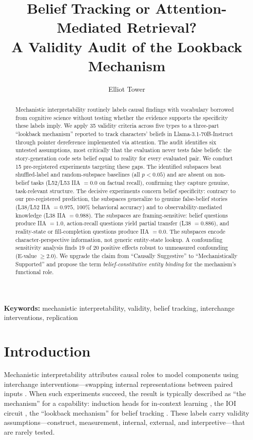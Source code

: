 \documentclass[11pt]{article}
\title{Belief Tracking or Attention-Mediated Retrieval?\\A Validity Audit of the Lookback Mechanism}
\author{Elliot Tower}
\affil{Independent Researcher \\ \texttt{elliot@elliottower.ai}}
\begin{document}
\linenumbers
\maketitle

\begin{abstract}
Mechanistic interpretability routinely labels causal findings with vocabulary borrowed from cognitive science without testing whether the evidence supports the specificity these labels imply. We apply 35 validity criteria across five types to a three-part ``lookback mechanism'' reported to track characters' beliefs in Llama-3.1-70B-Instruct through pointer dereference implemented via attention. The audit identifies six untested assumptions, most critically that the evaluation never tests false beliefs: the story-generation code sets belief equal to reality for every evaluated pair. We conduct 15 pre-registered experiments targeting these gaps. The identified subspaces beat shuffled-label and random-subspace baselines (all $p < 0.05$) and are absent on non-belief tasks (L52/L53 IIA $= 0.0$ on factual recall), confirming they capture genuine, task-relevant structure. The decisive experiments concern belief specificity: contrary to our pre-registered prediction, the subspaces generalize to genuine false-belief stories (L38/L52 IIA $= 0.975$, 100\% behavioral accuracy) and to observability-mediated knowledge (L38 IIA $= 0.988$). The subspaces are framing-sensitive: belief questions produce IIA $= 1.0$, action-recall questions yield partial transfer (L38 $= 0.886$), and reality-state or fill-completion questions produce IIA $= 0.0$. The subspaces encode character-perspective information, not generic entity-state lookup. A confounding sensitivity analysis finds 19 of 20 positive effects robust to unmeasured confounding (E-value $\geq 2.0$). We upgrade the claim from ``Causally Suggestive'' to ``Mechanistically Supported'' and propose the term \emph{belief-constitutive entity binding} for the mechanism's functional role.
\end{abstract}

\noindent\textbf{Keywords:} mechanistic interpretability, validity, belief tracking, interchange interventions, replication


\section{Introduction}
\label{sec:intro}

Mechanistic interpretability attributes causal roles to model components using interchange interventions---swapping internal representations between paired inputs \citep{geiger2021causal, vig2020investigating}. When such experiments succeed, the result is typically described as ``the mechanism'' for a capability: induction heads for in-context learning \citep{olsson2022context}, the IOI circuit \citep{wang2023interpretability}, the ``lookback mechanism'' for belief tracking \citep{prakash2025lookback}. These labels carry validity assumptions---construct, measurement, internal, external, and interpretive---that are rarely tested.
\end{document}
